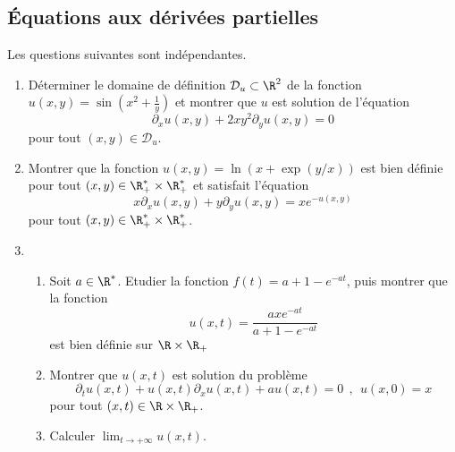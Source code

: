 \subsection{Équations aux dérivées partielles}


\begin{exo} Les questions suivantes sont indépendantes.
    \begin{enumerate}
        \item Déterminer le domaine de définition $\mathcal{D}_{u} \subset \R ^{2}$ de la fonction $u(x,y) = \sin(x^{2} + \frac{1}{y})$ et
        montrer que $u$ est solution de l'équation
        $$
            \partial_{x}u(x,y) + 2xy^{2}\partial_{y}u(x,y) = 0
        $$
        pour tout $(x,y) \in \mathcal{D}_{u}$.
        \item Montrer que la fonction $u(x,y)=\ln(x+\exp(y/x))$ est bien définie pour tout
        $(x,y) \in \R _{+}^{\ast}\times \R _{+}^{\ast}$ et satisfait l'équation
        $$
            x\partial_{x}u(x,y) + y\partial_{y}u(x,y) = xe^{-u(x,y)}
        $$
        pour tout  $(x,y) \in \R _{+}^{\ast}\times \R _{+}^{\ast}$.
        \item
            \begin{enumerate}
                \item Soit $a \in \R ^{\ast}$. Etudier la fonction $f(t)=a+1 - e^{-at}$, puis montrer que la fonction
                    $$
                        u(x,t) = \frac{axe^{-at}}{a+1 - e^{-at}}
                    $$
                    est bien définie sur $\R \times \R _{+}$
                \item  Montrer que $u(x,t)$ est solution du problème
                    $$
                        \partial_{t}u(x,t) + u(x,t)\partial_{x}u(x,t) + au(x,t) = 0 \ \ , \ \ u(x,0)=x
                    $$
                    pour tout $(x,t) \in \R \times \R _{+}$.
                \item Calculer $\lim_{t \rightarrow +\infty}u(x,t)$.
            \end{enumerate}
    \end{enumerate}
\end{exo}

